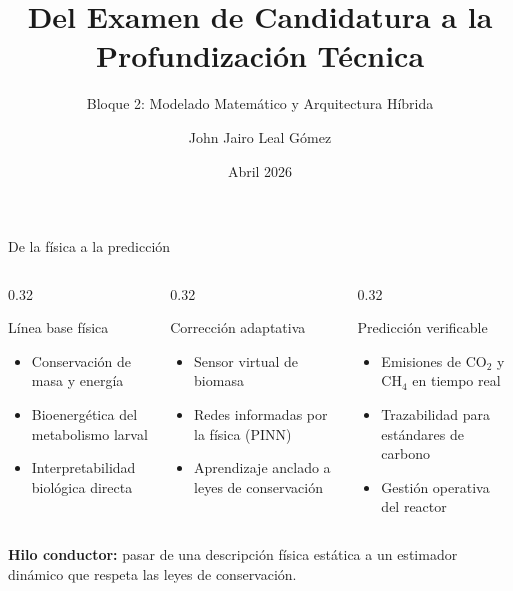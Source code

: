 \documentclass[aspectratio=169, 11pt]{beamer}
\title[Respuestas Examen]{Del Examen de Candidatura a la Profundización Técnica}
\subtitle{Bloque 2: Modelado Matemático y Arquitectura Híbrida}
\author{John Jairo Leal Gómez}
\institute[UNAL]{Doctorado en Estudios Ambientales\\Universidad Nacional de Colombia -- Sede Palmira}
\date{Abril 2026}
\begin{document}
\begin{frame}[plain]
    \titlepage
\end{frame}

\begin{frame}{De la f\'{i}sica a la predicci\'{o}n}
\begin{columns}[T]
\begin{column}{0.32\textwidth}
\begin{block}{L\'{i}nea base f\'{i}sica}
\begin{itemize}
    \item Conservaci\'{o}n de masa y energ\'{i}a
    \item Bioenerg\'{e}tica del metabolismo larval
    \item Interpretabilidad biol\'{o}gica directa
\end{itemize}
\end{block}
\end{column}
\begin{column}{0.32\textwidth}
\begin{exampleblock}{Correcci\'{o}n adaptativa}
\begin{itemize}
    \item Sensor virtual de biomasa
    \item Redes informadas por la f\'{i}sica (PINN)
    \item Aprendizaje anclado a leyes de conservaci\'{o}n
\end{itemize}
\end{exampleblock}
\end{column}
\begin{column}{0.32\textwidth}
\begin{block}{Predicci\'{o}n verificable}
\begin{itemize}
    \item Emisiones de CO$_2$ y CH$_4$ en tiempo real
    \item Trazabilidad para est\'{a}ndares de carbono
    \item Gesti\'{o}n operativa del reactor
\end{itemize}
\end{block}
\end{column}
\end{columns}
\vfill
\begin{center}
\textcolor{unalRojo}{\textbf{Hilo conductor:}} pasar de una descripci\'{o}n f\'{i}sica est\'{a}tica a un estimador din\'{a}mico que respeta las leyes de conservaci\'{o}n.
\end{center}
\end{frame}
\end{document}
